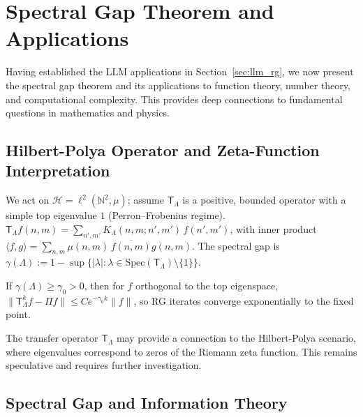 \section{Spectral Gap Theorem and Applications}
\label{sec:spectral-gap}

Having established the LLM applications in Section~\ref{sec:llm_rg}, we now present the spectral gap theorem and its applications to function theory, number theory, and computational complexity. This provides deep connections to fundamental questions in mathematics and physics.

\subsection{Hilbert-Polya Operator and Zeta-Function Interpretation}

\begin{definition}
\label{def:transfer-operator}
We act on $\mathcal{H}=\ell^2(\mathbb{N}^2,\mu)$; assume $\mathsf{T}_\Lambda$ is a positive, bounded operator with a simple top eigenvalue $1$ (Perron–Frobenius regime). $\mathsf{T}_\Lambda f(n,m)=\sum_{n',m'}K_\Lambda(n,m;n',m')\,f(n',m')$, with inner product $\langle f,g\rangle=\sum_{n,m} \mu(n,m)\, \overline{f(n,m)}g(n,m)$.
The spectral gap is $\gamma(\Lambda):=1-\sup\{|\lambda|:\lambda\in\mathrm{Spec}(\mathsf{T}_\Lambda)\setminus\{1\}\}$.
\end{definition}

\begin{theorem}
\label{thm:mixing-convergence}
If $\gamma(\Lambda)\ge\gamma_0>0$, then for $f$ orthogonal to the top eigenspace, $\|\mathsf{T}_\Lambda^k f - \Pi f\|\le C e^{-\gamma_0 k}\|f\|$,
so RG iterates converge exponentially to the fixed point.
\end{theorem}

\begin{conjecture}
\label{conj:hilbert-polya}
The transfer operator $\mathsf{T}_\Lambda$ may provide a connection to the Hilbert-Polya scenario, where eigenvalues correspond to zeros of the Riemann zeta function. This remains speculative and requires further investigation.
\end{conjecture}

\subsection{Spectral Gap and Information Theory}


